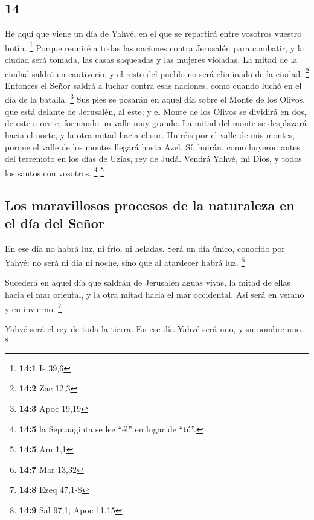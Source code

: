 \begin{paracol}{2}
\hypertarget{section-26}{%
\section{14}\label{section-26}}

 He aquí que viene un día de Yahvé, en el que se repartirá
entre vosotros vuestro botín. \footnote{\textbf{14:1} Is 39,6}
 Porque reuniré a todas las naciones contra Jerusalén para
combatir, y la ciudad será tomada, las casas saqueadas y las mujeres
violadas. La mitad de la ciudad saldrá en cautiverio, y el resto del
pueblo no será eliminado de la ciudad. \footnote{\textbf{14:2} Zac 12,3}
 Entonces el Señor saldrá a luchar contra esas naciones,
como cuando luchó en el día de la batalla. \footnote{\textbf{14:3} Apoc
  19,19}  Sus pies se posarán en aquel día sobre el Monte
de los Olivos, que está delante de Jerusalén, al este; y el Monte de los
Olivos se dividirá en dos, de este a oeste, formando un valle muy
grande. La mitad del monte se desplazará hacia el norte, y la otra mitad
hacia el sur.  Huiréis por el valle de mis montes, porque
el valle de los montes llegará hasta Azel. Sí, huirán, como huyeron
antes del terremoto en los días de Uzías, rey de Judá. Vendrá Yahvé, mi
Dios, y todos los santos con vosotros. \footnote{\textbf{14:5} la
  Septuaginta se lee ``él'' en lugar de ``tú''.} \footnote{\textbf{14:5}
  Am 1,1}

\hypertarget{los-maravillosos-procesos-de-la-naturaleza-en-el-duxeda-del-seuxf1or}{%
\subsection{Los maravillosos procesos de la naturaleza en el día del
Señor}\label{los-maravillosos-procesos-de-la-naturaleza-en-el-duxeda-del-seuxf1or}}

 En ese día no habrá luz, ni frío, ni heladas.
 Será un día único, conocido por Yahvé: no será ni día ni
noche, sino que al atardecer habrá luz. \footnote{\textbf{14:7} Mar
  13,32}

 Sucederá en aquel día que saldrán de Jerusalén aguas
vivas, la mitad de ellas hacia el mar oriental, y la otra mitad hacia el
mar occidental. Así será en verano y en invierno. \footnote{\textbf{14:8}
  Ezeq 47,1-8}

 Yahvé será el rey de toda la tierra. En ese día Yahvé
será uno, y su nombre uno. \footnote{\textbf{14:9} Sal 97,1; Apoc 11,15}


\end{paracol}
